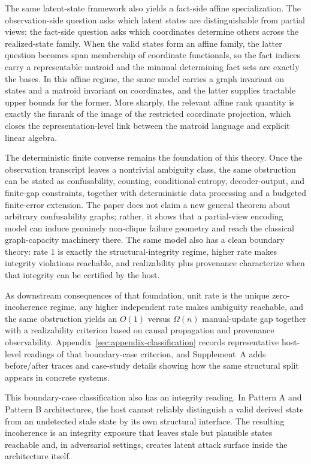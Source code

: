 The same latent-state framework also yields a fact-side affine specialization. The observation-side question asks which latent states are distinguishable from partial views; the fact-side question asks which coordinates determine others across the realized-state family. When the valid states form an affine family, the latter question becomes span membership of coordinate functionals, so the fact indices carry a representable matroid and the minimal determining fact sets are exactly the bases. In this affine regime, the same model carries a graph invariant on states and a matroid invariant on coordinates, and the latter supplies tractable upper bounds for the former. More sharply, the relevant affine rank quantity is exactly the finrank of the image of the restricted coordinate projection, which closes the representation-level link between the matroid language and explicit linear algebra.

The deterministic finite converse remains the foundation of this theory. Once the observation transcript leaves a nontrivial ambiguity class, the same obstruction can be stated as confusability, counting, conditional-entropy, decoder-output, and finite-gap constraints, together with deterministic data processing and a budgeted finite-error extension. The paper does not claim a new general theorem about arbitrary confusability graphs; rather, it shows that a partial-view encoding model can induce genuinely non-clique failure geometry and reach the classical graph-capacity machinery there. The same model also has a clean boundary theory: rate $1$ is exactly the structural-integrity regime, higher rate makes integrity violations reachable, and realizability plus provenance characterize when that integrity can be certified by the host.

As downstream consequences of that foundation, unit rate is the unique zero-incoherence regime, any higher independent rate makes ambiguity reachable, and the same obstruction yields an $O(1)$ versus $\Omega(n)$ manual-update gap together with a realizability criterion based on causal propagation and provenance observability. Appendix~\ref{sec:appendix-classification} records representative host-level readings of that boundary-case criterion, and Supplement~A adds before/after traces and case-study details showing how the same structural split appears in concrete systems.

This boundary-case classification also has an integrity reading. In Pattern A and Pattern B architectures, the host cannot reliably distinguish a valid derived state from an undetected stale state by its own structural interface. The resulting incoherence is an integrity exposure that leaves stale but plausible states reachable and, in adversarial settings, creates latent attack surface inside the architecture itself.

